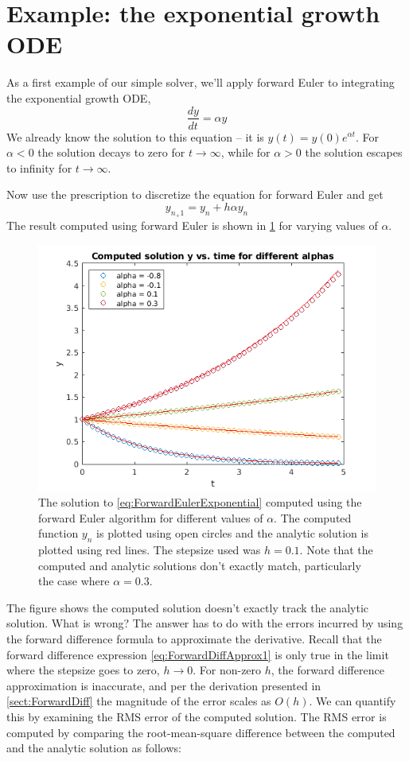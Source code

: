 \documentclass[hidelinks,notitlepage]{book}
\begin{document}
\section{Example: the exponential growth ODE}
\label{sect:ForwardEulerExponential}
As a first example of our simple solver, we'll apply forward Euler to integrating the exponential growth ODE,
\begin{equation}
\label{eq:ForwardEulerExponential}
\frac{d y}{d t} = \alpha y
\end{equation}
We already know the solution to this equation -- it is $y(t) = y(0) e^{\alpha t}$.  For $\alpha < 0$ the solution decays to zero for $t \rightarrow \infty$, while for $\alpha > 0$ the solution escapes to infinity for $t \rightarrow \infty$.

Now use the prescription to discretize the equation for forward Euler and get
\begin{equation}
y_{n_+1} = y_n + h\alpha y_n
\end{equation}
The result computed using forward Euler is shown in \cref{fig:ForwardEulerExponential} for varying values of $\alpha$.  
\begin{figure}[tbh]
	\centering
	\includegraphics[width=0.7\columnwidth]{ForwardEulerExponential.png}
	\caption{The solution to \cref{eq:ForwardEulerExponential} computed using the forward Euler algorithm for different values of $\alpha$.  The computed function $y_n$ is plotted using open circles and the analytic solution is plotted using red lines.  The stepsize used was $h=0.1$.  Note that the computed and analytic solutions don't exactly match, particularly the case where $\alpha = 0.3$.}
	\label{fig:ForwardEulerExponential}
\end{figure}
The figure shows the computed solution doesn't exactly track the analytic solution.  What is wrong?  The answer has to do with the errors incurred by using the forward difference formula to approximate the derivative.  Recall that the forward difference expression \cref{eq:ForwardDiffApprox1} is only true in the limit where the stepsize goes to zero, $h \rightarrow 0$.  For non-zero $h$, the forward difference approximation is inaccurate, and per the derivation presented in \cref{sect:ForwardDiff} the magnitude of the error scales as $O(h)$.  We can quantify this by examining the RMS error of the computed solution.  The RMS error is computed by comparing the root-mean-square difference between the computed and the analytic solution as follows:
\end{document}
